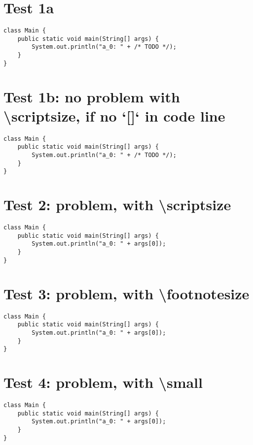 \documentclass{tudapub}
\begin{document}
\section{Test 1a}

\begin{verbatim}
class Main {
    public static void main(String[] args) {
        System.out.println("a_0: " + /* TODO */);
    }
}
\end{verbatim}


\section{Test 1b: no problem with \textbackslash scriptsize, if no `[]` in code line}
\begin{verbatim}
class Main {
    public static void main(String[] args) {
        System.out.println("a_0: " + /* TODO */);
    }
}
\end{verbatim}


\section{Test 2: problem, with \textbackslash scriptsize}
\begin{verbatim}
class Main {
    public static void main(String[] args) {
        System.out.println("a_0: " + args[0]);
    }
}
\end{verbatim}


\section{Test 3: problem, with \textbackslash footnotesize}
\begin{verbatim}
class Main {
    public static void main(String[] args) {
        System.out.println("a_0: " + args[0]);
    }
}
\end{verbatim}


\section{Test 4: problem, with \textbackslash small}
\begin{verbatim}
class Main {
    public static void main(String[] args) {
        System.out.println("a_0: " + args[0]);
    }
}
\end{verbatim}
\end{document}
